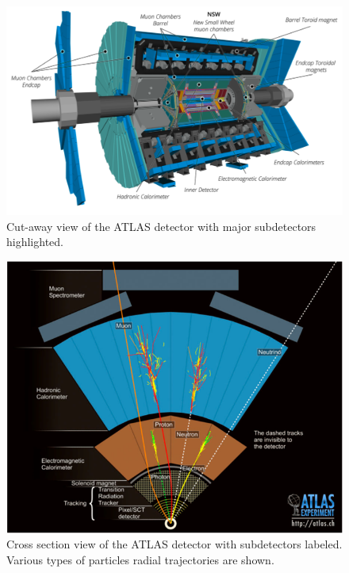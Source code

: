	\begin{figure}[!ht]
	\centering
	\includegraphics[width=.75\textwidth,keepaspectratio=true]{chapters/chapter3_experiment/images/ATLAS_3d_run3.png}
	\caption{ Cut-away view of the ATLAS detector with major subdetectors highlighted.}
	\label{fig:ATLAS}
	\end{figure}

	\begin{figure}[!ht]
	\centering
	\includegraphics[width=.65\textwidth,keepaspectratio=true]{chapters/chapter3_experiment/images/ATLASCrossSectionDiagram.png}
	\caption{ Cross section view of the ATLAS detector with subdetectors labeled. Various types of particles radial trajectories are shown.}
	\label{fig:ATLAS-XSec}
	\end{figure}

